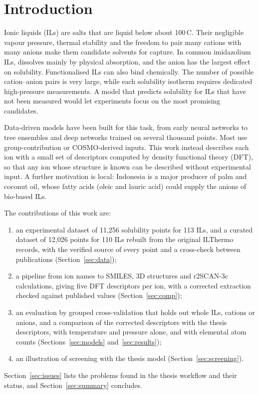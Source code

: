 \section{Introduction}
\label{sec:intro}

Ionic liquids (ILs) are salts that are liquid below about 100\,\textdegree C. Their negligible vapour pressure, thermal stability and the freedom to pair many cations with many anions make them candidate solvents for \co{} capture\cite{blanchard1999green, brennecke2010ionic, zhang2012carbon, aghaie2018systematic}. In common imidazolium ILs, \co{} dissolves mainly by physical absorption, and the anion has the largest effect on solubility\cite{cadena2004why, anthony2005anion}. Functionalised ILs can also bind \co{} chemically\cite{bates2002co2, gurkan2010equimolar}. The number of possible cation--anion pairs is very large, while each solubility isotherm requires dedicated high-pressure measurements. A model that predicts solubility for ILs that have not been measured would let experiments focus on the most promising candidates.

Data-driven models have been built for this task, from early neural networks\cite{eslamimanesh2011artificial} to tree ensembles and deep networks trained on several thousand points\cite{venkatraman2017predicting, song2020prediction, ali2024prediction}. Most use group-contribution or COSMO-derived inputs. This work instead describes each ion with a small set of descriptors computed by density functional theory (DFT), so that any ion whose structure is known can be described without experimental input. A further motivation is local: Indonesia is a major producer of palm and coconut oil, whose fatty acids (oleic and lauric acid) could supply the anions of bio-based ILs.

The contributions of this work are:
\begin{enumerate}
    \item an experimental dataset of 11,256 \co{} solubility points for 113 ILs, and a curated dataset of 12,026 points for 110 ILs rebuilt from the original ILThermo records, with the verified source of every point and a cross-check between publications (Section~\ref{sec:data});
    \item a pipeline from ion names to SMILES, 3D structures and r2SCAN-3c calculations, giving five DFT descriptors per ion, with a corrected extraction checked against published values (Section~\ref{sec:comp});
    \item an evaluation by grouped cross-validation that holds out whole ILs, cations or anions, and a comparison of the corrected descriptors with the thesis descriptors, with temperature and pressure alone, and with elemental atom counts (Sections~\ref{sec:models} and~\ref{sec:results});
    \item an illustration of screening with the thesis model (Section~\ref{sec:screening}).
\end{enumerate}
Section~\ref{sec:issues} lists the problems found in the thesis workflow and their status, and Section~\ref{sec:summary} concludes.
